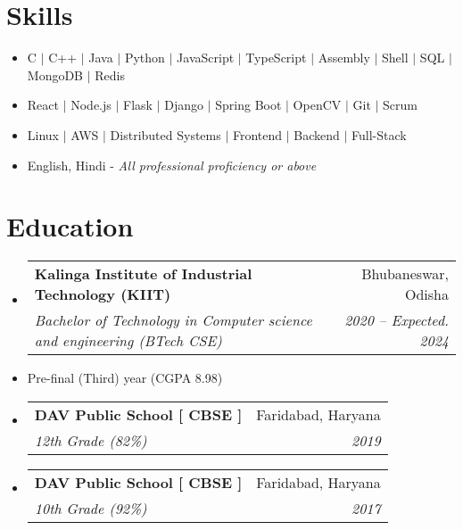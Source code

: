 \documentclass[letterpaper,11pt]{article}
\makeatletter
\newcommand{\resumeItem}[1]{
  \item\small{
    {#1 \vspace{-2pt}}
  }
}
\newcommand{\resumeSubheading}[4]{
  \vspace{-2pt}\item
    \begin{tabular*}{0.97\textwidth}[t]{l@{\extracolsep{\fill}}r}
      \textbf{#1} & #2 \\
      \textit{\small#3} & \textit{\small #4} \\
    \end{tabular*}\vspace{-7pt}
}
\newcommand{\resumeSubHeadingListStart}{\begin{itemize}[leftmargin=0.15in, label={}]}
\newcommand{\resumeSubHeadingListEnd}{\end{itemize}}
\newcommand{\resumeItemListStart}{\begin{itemize}}
\newcommand{\resumeItemListEnd}{\end{itemize}\vspace{-5pt}}
\makeatother
\begin{document}
%
\section{Skills}
    \begin{itemize}[leftmargin=0.15in, label={}]
        \small{\item{
            \resumeItemListStart
                \resumeItem{ C $|$ C++ $|$ Java $|$ Python $|$ JavaScript $|$ TypeScript $|$ Assembly $|$ Shell $|$ SQL $|$ MongoDB $|$ Redis}
                \resumeItem{ React $|$ Node.js $|$ Flask $|$ Django $|$ Spring Boot $|$ OpenCV $|$ Git $|$ Scrum}
                \resumeItem{ Linux $|$ AWS $|$ Distributed Systems $|$ Frontend $|$ Backend $|$ Full-Stack}
                \resumeItem{ English, Hindi - \textit{All professional proficiency or above}}
            \resumeItemListEnd
        }}
    \end{itemize}

 
\section{Education}
  \resumeSubHeadingListStart
    \resumeSubheading
      {Kalinga Institute of Industrial Technology (KIIT)}{Bhubaneswar, Odisha}
      {Bachelor of Technology in Computer science and engineering (BTech CSE)}{2020 -- Expected. 2024}
      \resumeItem{Pre-final (Third) year (CGPA 8.98)}

    \resumeSubheading
      {DAV Public School [ CBSE ]}{Faridabad, Haryana}
      {12th Grade (82\%)}{2019}

    \resumeSubheading
      {DAV Public School [ CBSE ]}{Faridabad, Haryana}
      {10th Grade (92\%)}{2017}
  \resumeSubHeadingListEnd
\end{document}
